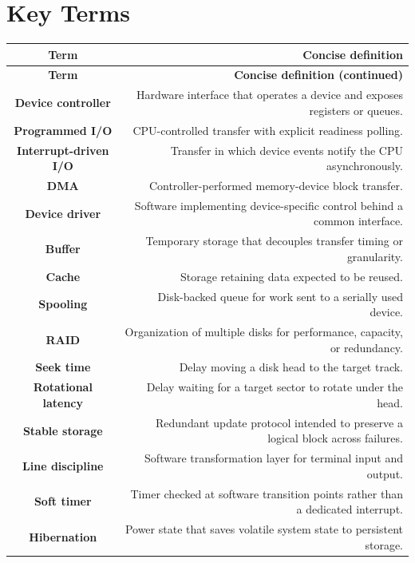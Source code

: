 \documentclass[10pt,letterpaper]{article}
\begin{document}
\section*{Key Terms}
\small
\begin{longtable}{C N}
\color{white}\textbf{Term} & \color{white}\textbf{Concise definition}\\
\endfirsthead
{}\color{white}\textbf{Term} & \color{white}\textbf{Concise definition (continued)}\\
\endhead
\textbf{Device controller} & Hardware interface that operates a device and exposes registers or queues.\\\hline
\textbf{Programmed I/O} & CPU-controlled transfer with explicit readiness polling.\\\hline
\textbf{Interrupt-driven I/O} & Transfer in which device events notify the CPU asynchronously.\\\hline
\textbf{DMA} & Controller-performed memory-device block transfer.\\\hline
\textbf{Device driver} & Software implementing device-specific control behind a common interface.\\\hline
\textbf{Buffer} & Temporary storage that decouples transfer timing or granularity.\\\hline
\textbf{Cache} & Storage retaining data expected to be reused.\\\hline
\textbf{Spooling} & Disk-backed queue for work sent to a serially used device.\\\hline
\textbf{RAID} & Organization of multiple disks for performance, capacity, or redundancy.\\\hline
\textbf{Seek time} & Delay moving a disk head to the target track.\\\hline
\textbf{Rotational latency} & Delay waiting for a target sector to rotate under the head.\\\hline
\textbf{Stable storage} & Redundant update protocol intended to preserve a logical block across failures.\\\hline
\textbf{Line discipline} & Software transformation layer for terminal input and output.\\\hline
\textbf{Soft timer} & Timer checked at software transition points rather than a dedicated interrupt.\\\hline
\textbf{Hibernation} & Power state that saves volatile system state to persistent storage.\\\hline
\end{longtable}
\normalsize
\end{document}
